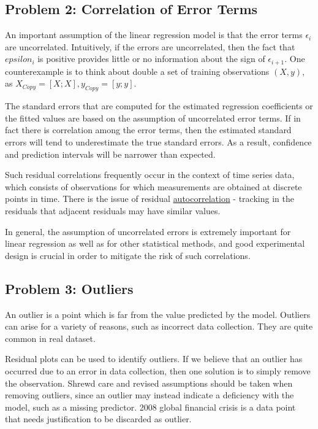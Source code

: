 \documentclass[
]{book}
\begin{document}
\hypertarget{problem-2-correlation-of-error-terms}{%
\subsection*{Problem 2: Correlation of Error Terms}\label{problem-2-correlation-of-error-terms}}

An important assumption of the linear regression model is that the error terms \({\epsilon_i}\) are uncorrelated. Intuitively, if the errors are uncorrelated, then the fact that \(epsilon_i\) is positive provides little or no information about the sign of \(\epsilon_{i+1}\). One counterexample is to think about double a set of training observations \((X, y)\), as \(X_{Copy} = [X;X], y_{Copy}=[y;y]\).

The standard errors that are computed for the estimated regression coefficients or the fitted values are based on the assumption of uncorrelated error terms. If in fact there is correlation among the error terms, then the estimated standard errors will tend to {underestimate} the true standard errors. As a result, confidence and prediction intervals will be narrower than expected.

Such residual correlations frequently occur in the context of {time series data}, which consists of observations for which measurements are obtained at discrete points in time. There is the issue of {residual \href{https://en.wikipedia.org/wiki/Autocorrelation}{autocorrelation}} - tracking in the residuals that adjacent residuals may have similar values.

In general, the assumption of uncorrelated errors is extremely important for linear regression as well as for other statistical methods, and good experimental design is crucial in order to mitigate the risk of such correlations.

\hypertarget{problem-3-outliers}{%
\subsection*{Problem 3: Outliers}\label{problem-3-outliers}}

An outlier is a point which is far from the value predicted by the model. Outliers can arise for a variety of reasons, such as incorrect data collection. They are quite common in real dataset.

Residual plots can be used to identify outliers. If we believe that an outlier has occurred due to an error in data collection, then one solution is to simply remove the observation. Shrewd care and revised assumptions should be taken when removing outliers, since an outlier may instead indicate a deficiency with the model, such as a missing predictor. 2008 global financial crisis is a data point that needs justification to be discarded as outlier.
\end{document}
